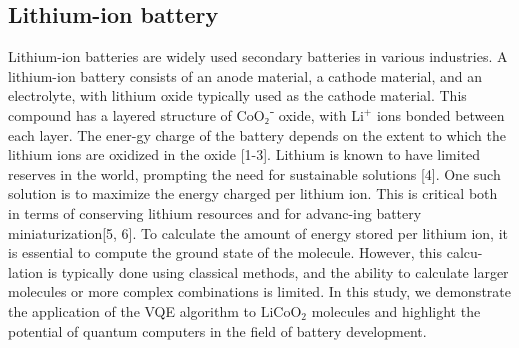 \documentclass[pdflatex,sn-mathphys-num]{sn-jnl}%
\theoremstyle{thmstyleone}%
\theoremstyle{thmstyletwo}%
\theoremstyle{thmstylethree}%
\begin{document}
\subsection{Lithium-ion battery}\label{subsec2.1}
Lithium-ion batteries are widely used secondary batteries in various industries. A lithium-ion battery consists of an anode material, a cathode material, and an electrolyte, with lithium oxide typically used as the cathode material. This compound has a layered structure of CoO₂⁻ oxide, with \(\mathrm{Li^+}\) ions bonded between each layer. The ener-gy charge of the battery depends on the extent to which the lithium ions are oxidized in the oxide [1-3].
Lithium is known to have limited reserves in the world, prompting the need for sustainable solutions [4]. One such solution is to maximize the energy charged per lithium ion. This is critical both in terms of conserving lithium resources and for advanc-ing battery miniaturization[5, 6]. To calculate the amount of energy stored per lithium ion, it is essential to compute the ground state of the molecule. However, this calcu-lation is typically done using classical methods, and the ability to calculate larger molecules or more complex combinations is limited.
In this study, we demonstrate the application of the VQE algorithm to \(\mathrm{LiCoO_2}\) molecules and highlight the potential of quantum computers in the field of battery development.
\end{document}
